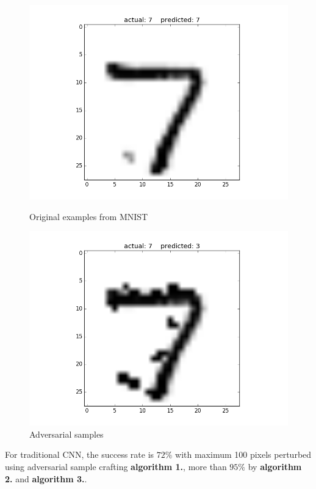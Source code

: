 \documentclass{article}
\begin{document}
\begin{figure}[h!]
	\begin{minipage}{0.5\textwidth}
		\centering
		\includegraphics[width=\textwidth]{sample_original2.png}
		\caption{Original examples from MNIST}
	\end{minipage} \hfill
	\begin{minipage}{0.5\textwidth}
		\centering
		\includegraphics[width=\textwidth]{sample_perturbed2.png}
		\caption{Adversarial samples}
	\end{minipage}
\end{figure}

For traditional CNN, the success rate is $72\%$ with maximum 100 pixels perturbed using adversarial sample crafting \textbf{algorithm 1.}, more than $95\%$ by \textbf{algorithm 2.} and \textbf{algorithm 3.}.
\end{document}
